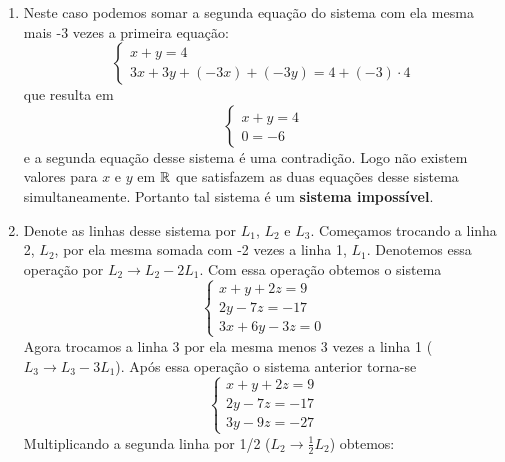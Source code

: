 \begin{exemplos}
    \begin{solucao}
        \begin{enumerate}[label={\arabic*})]
            \item Neste caso podemos somar a segunda equação do sistema com ela mesma mais -3 vezes a primeira equação:
                \[
                    \begin{cases}
                        x + y = 4\\
                        3x + 3y + (-3x) + (-3y) = 4 + (-3)\cdot 4
                    \end{cases}
                \]
            que resulta em
            \[
                \begin{cases}
                    x + y = 4\\
                    0 = -6
                \end{cases}
            \]
            e a segunda equação desse sistema é uma contradição. Logo não existem valores para $x$ e $y$ em $\mathbb{R}$ que satisfazem as duas equações desse sistema simultaneamente. Portanto tal sistema é um \textbf{sistema impossível}.
                    \item Denote as linhas desse sistema por $L_1$, $L_2$ e $L_3$. Começamos trocando a linha 2, $L_2$, por ela mesma somada com -2 vezes a linha 1, $L_1$. Denotemos essa operação por $L_2 \to L_2 - 2L_1$. Com essa operação obtemos o sistema
                        \[
                            \begin{cases}
                                x + y + 2z = 9\\
                                2y - 7z = -17\\
                                3x + 6y - 3z = 0
                            \end{cases}
                        \]
                        Agora trocamos a linha 3 por ela mesma menos 3 vezes a linha 1 ($L_3 \to L_3 - 3L_1$). Após essa operação o sistema anterior torna-se
                        \[
                            \begin{cases}
                                x + y + 2z = 9\\
                                2y - 7z = -17\\
                                3y - 9z = -27
                            \end{cases}
                        \]
                        Multiplicando a segunda linha por 1/2 ($L_2 \to \frac{1}{2}L_2$) obtemos:
                        \[
\]
\end{enumerate}
\end{solucao}
\end{exemplos}
